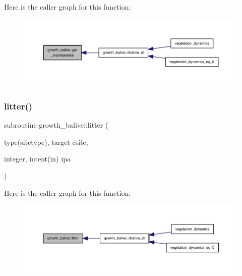 Here is the caller graph for this function\+:
\nopagebreak
\begin{figure}[H]
\begin{center}
\leavevmode
\includegraphics[width=350pt]{namespacegrowth__balive_ac2f667372e6f2a5fc7329466cc958a6c_icgraph}
\end{center}
\end{figure}
\mbox{\label{namespacegrowth__balive_affc86c9f292d8fa6d67dfe1d0df69337}} 
\subsubsection{\texorpdfstring{litter()}{litter()}}
{\footnotesize\ttfamily subroutine growth\+\_\+balive\+::litter (\begin{DoxyParamCaption}\item[{type(sitetype), target}]{csite,  }\item[{integer, intent(in)}]{ipa }\end{DoxyParamCaption})}

Here is the caller graph for this function\+:
\nopagebreak
\begin{figure}[H]
\begin{center}
\leavevmode
\includegraphics[width=350pt]{namespacegrowth__balive_affc86c9f292d8fa6d67dfe1d0df69337_icgraph}
\end{center}
\end{figure}
\mbox{\label{namespacegrowth__balive_a7921154a300d0b56c862c78f641e5d3b}} 

